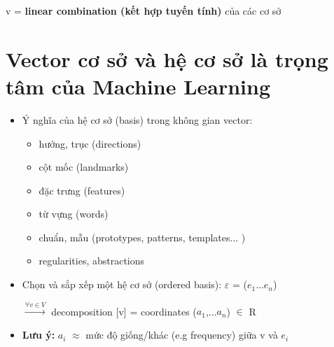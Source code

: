 \documentclass{article}
\begin{document}
v = \textbf{linear combination (kết hợp tuyến tính)} của các cơ sở

\section{Vector cơ sở và hệ cơ sở là trọng tâm của Machine Learning}

\begin{itemize}
    \item Ý nghĩa của hệ cơ sở (basis) trong không gian vector:
    \begin{itemize}
        \item hướng, trục (directions)
        \item cột mốc (landmarks)
        \item đặc trưng (features)
        \item từ vựng (words)
        \item chuẩn, mẫu (prototypes, patterns, templates... )
        \item regularities, abstractions
    \end{itemize}
    \item Chọn và sắp xếp một hệ cơ sở (ordered basis):
    $\varepsilon $ = ($e_{1}$...$e_{n}$)
   
    $\overset{\forall v\in V }{\rightarrow}$ decomposition 
    [v] = coordinates ($a_{1}$,...$a_{n}$) $\in$ R
    
    \item \textbf{Lưu ý: }$a_{i}$ $\approx $ mức độ giống/khác (e.g frequency) giữa v và $e_{i}$
    
\end{itemize}
\end{document}
